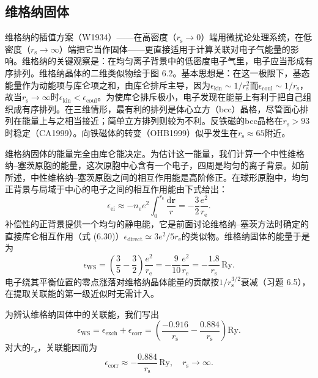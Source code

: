 \subsection{维格纳固体}

维格纳的插值方案（W1934）——在高密度（$r_{\mathrm{s}} \to 0$）端用微扰论处理系统，在低密度（$r_{\mathrm{s}} \to \infty$）端把它当作固体——更直接适用于计算关联对电子气能量的影响。维格纳的关键观察是：在均匀离子背景中的低密度电子气里，电子应当形成有序排列。维格纳晶体的二维类似物绘于图 6.2。基本思想是：在这一极限下，基态能量作为动能项与库仑项之和，由库仑排斥主导，因为$\epsilon_{\mathrm{kin}} \sim 1/r_{\mathrm{s}}^2$而$\epsilon_{\mathrm{coul}} \sim 1/r_{\mathrm{s}}$，故当$r_{\mathrm{s}} \to \infty$时$\epsilon_{\mathrm{kin}} < \epsilon_{\mathrm{coul}}$。为使库仑排斥极小，电子发现在能量上有利于把自己组织成有序排列。在三维情形，最有利的排列是体心立方（bcc）晶格，尽管面心排列在能量上与之相当接近；简单立方排列则较为不利。反铁磁的bcc晶格在$r_{\mathrm{s}} > 93$时稳定（CA1999）。向铁磁体的转变（OHB1999）似乎发生在$r_{\mathrm{s}} \approx 65$附近。

维格纳固体的能量完全由库仑能决定。为估计这一能量，我们计算一个中性维格纳–塞茨原胞的能量，这次原胞中心含有一个电子，四周是均匀的离子背景。如前所述，中性维格纳–塞茨原胞之间的相互作用能是高阶修正。在球形原胞中，均匀正背景与局域于中心的电子之间的相互作用能由下式给出：
\begin{equation*}
\epsilon_{\mathrm{ei}} \approx -n_{\mathrm{e}}e^2\int_0^{r_{\mathrm{e}}} \frac{\mathrm{d}\mathbf{r}}{r} = -\frac{3}{2}\frac{e^2}{r_{\mathrm{e}}}.
\tag{6.34}
\end{equation*}
补偿性的正背景提供一个均匀的静电能，它是前面讨论维格纳–塞茨方法时确定的直接库仑相互作用（式 (6.30)）$\epsilon_{\mathrm{direct}} \simeq 3e^2/5r_{\mathrm{e}}$的类似物。维格纳固体的能量于是为
\begin{equation*}
\epsilon_{\mathrm{WS}} = \left(\frac{3}{5} - \frac{3}{2}\right)\frac{e^2}{r_{\mathrm{e}}} = -\frac{9}{10}\frac{e^2}{r_{\mathrm{e}}} = -\frac{1.8}{r_{\mathrm{s}}}\,\mathrm{Ry}.
\tag{6.35}
\end{equation*}
电子绕其平衡位置的零点涨落对维格纳晶体能量的贡献按$1/r_{\mathrm{s}}^{3/2}$衰减（习题 6.5），在提取关联能的第一级近似时无需计入。

为辨认维格纳固体中的关联能，我们写出
\begin{equation*}
\epsilon_{\mathrm{WS}} = \epsilon_{\mathrm{exch}} + \epsilon_{\mathrm{corr}} = \left(\frac{-0.916}{r_{\mathrm{s}}} - \frac{0.884}{r_{\mathrm{s}}}\right)\mathrm{Ry}.
\tag{6.36}
\end{equation*}
对大的$r_{\mathrm{s}}$，关联能因而为
\begin{equation*}
\epsilon_{\mathrm{corr}} \approx -\frac{0.884}{r_{\mathrm{s}}}\,\mathrm{Ry},\quad r_{\mathrm{s}} \to \infty.
\tag{6.37}
\end{equation*}

